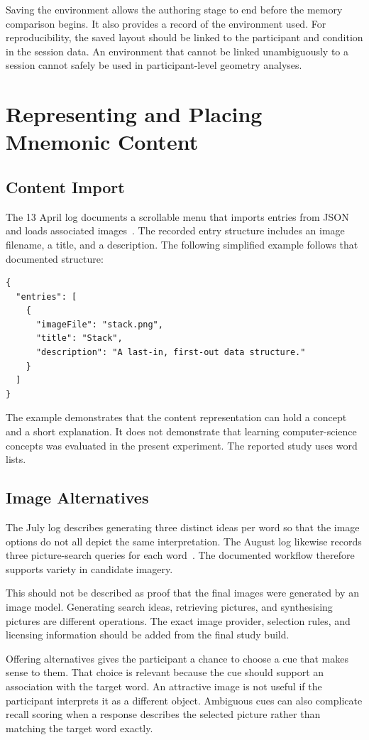 Saving the environment allows the authoring stage to end before the memory comparison begins. It also provides a record of the environment used. For reproducibility, the saved layout should be linked to the participant and condition in the session data. An environment that cannot be linked unambiguously to a session cannot safely be used in participant-level geometry analyses.

\section{Representing and Placing Mnemonic Content}
\subsection{Content Import}
The 13 April log documents a scrollable menu that imports entries from JSON and loads associated images~\cite{logapril13}. The recorded entry structure includes an image filename, a title, and a description. The following simplified example follows that documented structure:
{\small
\begin{verbatim}
{
  "entries": [
    {
      "imageFile": "stack.png",
      "title": "Stack",
      "description": "A last-in, first-out data structure."
    }
  ]
}
\end{verbatim}
}
The example demonstrates that the content representation can hold a concept and a short explanation. It does not demonstrate that learning computer-science concepts was evaluated in the present experiment. The reported study uses word lists.

\subsection{Image Alternatives}
The July log describes generating three distinct ideas per word so that the image options do not all depict the same interpretation. The August log likewise records three picture-search queries for each word~\cite{logjuly17,logaug13}. The documented workflow therefore supports variety in candidate imagery.

This should not be described as proof that the final images were generated by an image model. Generating search ideas, retrieving pictures, and synthesising pictures are different operations. The exact image provider, selection rules, and licensing information should be added from the final study build.

Offering alternatives gives the participant a chance to choose a cue that makes sense to them. That choice is relevant because the cue should support an association with the target word. An attractive image is not useful if the participant interprets it as a different object. Ambiguous cues can also complicate recall scoring when a response describes the selected picture rather than matching the target word exactly.

